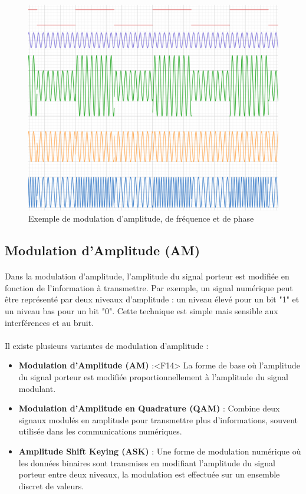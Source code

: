 \documentclass[a4paper,twocolumn]{report}
\begin{document}
\begin{figure}[ht]
	\centering
	\caption{Exemple de modulation d'amplitude, de fréquence et de phase}
	\label{fig:modulation_example}
	\includegraphics[scale=0.25]{images/ModulationExemple.png}
\end{figure}

\subsection{Modulation d'Amplitude (AM)}
\paragraph{}Dans la modulation d'amplitude, l'amplitude du signal porteur est
modifiée en fonction de l'information à transmettre. Par exemple, un signal numérique
peut être représenté par deux niveaux d'amplitude : un niveau élevé pour un bit "1"
et un niveau bas pour un bit "0". Cette technique est simple mais sensible aux interférences et au bruit.
\paragraph{}Il existe plusieurs variantes de modulation d'amplitude :
\begin{itemize}
	\item \textbf{Modulation d'Amplitude (AM)} :<F14>
    La forme de base où l'amplitude du signal porteur est modifiée proportionnellement à l'amplitude du signal modulant.
	\item \textbf{Modulation d'Amplitude en Quadrature (QAM)} :
    Combine deux signaux modulés en amplitude pour transmettre plus d'informations,
    souvent utilisée dans les communications numériques.
	\item \textbf{Amplitude Shift Keying (ASK)} :
    Une forme de modulation numérique où les données binaires sont transmises en
    modifiant l'amplitude du signal porteur entre deux niveaux,
    la modulation est effectuée sur un ensemble discret de valeurs.
\end{itemize}
\end{document}
